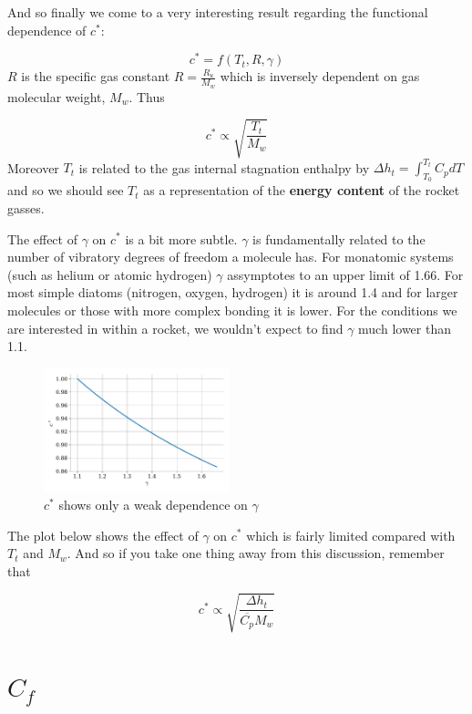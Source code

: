 \documentclass[twocolumn]{memoir} %
\begin{document}
And so finally we come to a very interesting result regarding the
functional dependence of $c^*$:

\begin{equation}c^* = f(T_t, R, \gamma)
\end{equation}
%
$R$ is the specific gas constant $R = \frac{R_u}{M_w}$ which is
inversely dependent on gas molecular weight, $M_w$. Thus

\begin{equation}c^* \propto \sqrt{\frac{T_t}{M_w}}
\end{equation}
%
Moreover $T_t$ is related to the gas internal stagnation enthalpy by
$\Delta h_t = \int_{T_0}^{T_t} C_p dT$ and so we should see $T_t$ as
a representation of the \textbf{energy content} of the rocket gasses.

The effect of $\gamma$ on $c^*$ is a bit more subtle. $\gamma$ is
fundamentally related to the number of vibratory degrees of freedom a
molecule has. For monatomic systems (such as helium or atomic hydrogen)
$\gamma$ assymptotes to an upper limit of 1.66. For most simple
diatoms (nitrogen, oxygen, hydrogen) it is around 1.4 and for larger
molecules or those with more complex bonding it is lower. For the
conditions we are interested in within a rocket, we wouldn't expect to
find $\gamma$ much lower than 1.1.

\begin{figure}[H]
    \includegraphics[width=0.48\textwidth]{imgs/cstar_gamma.pdf}
    \caption{$c^*$ shows only a weak dependence on $\gamma$}
\end{figure}

The plot below shows the effect of $\gamma$ on $c^*$ which is fairly
limited compared with $T_t$ and $M_w$. And so if you take one thing
away from this discussion, remember that

\begin{equation}c^* \propto \sqrt{\frac{\Delta h_t}{\overline{C_p} M_w}}
\end{equation}

\section{$C_f$}
\end{document}
